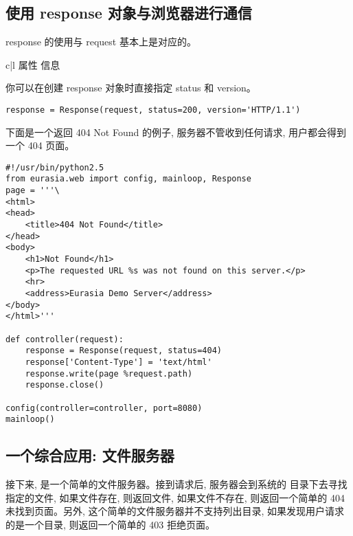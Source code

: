 \documentclass{manual}
\begin{document}
\subsection{使用 response 对象与浏览器进行通信}

response 的使用与 request 基本上是对应的。

\begin{tableii}{c|l}{}{ 属性 }{ 信息 }
\end{tableii}

你可以在创建 response 对象时直接指定 status 和 version。

\begin{verbatim}
response = Response(request, status=200, version='HTTP/1.1')
\end{verbatim}

下面是一个返回 404 Not Found 的例子, 服务器不管收到任何请求, 用户都会得到一个 404 页面。

\begin{verbatim}
#!/usr/bin/python2.5
from eurasia.web import config, mainloop, Response
page = '''\
<html>
<head>
	<title>404 Not Found</title>
</head>
<body>
	<h1>Not Found</h1>
	<p>The requested URL %s was not found on this server.</p>
	<hr>
	<address>Eurasia Demo Server</address>
</body>
</html>'''

def controller(request):
	response = Response(request, status=404)
	response['Content-Type'] = 'text/html'
	response.write(page %request.path)
	response.close()

config(controller=controller, port=8080)
mainloop()
\end{verbatim}

\subsection{一个综合应用: 文件服务器}

接下来, 是一个简单的文件服务器。接到请求后, 服务器会到系统的  目录下去寻找指定的文件, 如果文件存在, 则返回文件, 如果文件不存在, 则返回一个简单的 404 未找到页面。另外, 这个简单的文件服务器并不支持列出目录, 如果发现用户请求的是一个目录, 则返回一个简单的 403 拒绝页面。

\end{document}
